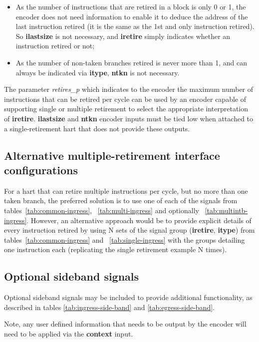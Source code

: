 \begin{itemize}
  \item As the number of instructions that are retired in a block is only 0 or 1, the 
    encoder does not need information to enable it to deduce the address of the last instruction 
    retired (it is the same as the 1st and only instruction retired).  So 
    \textbf{ilastsize} is not necessary, and \textbf{iretire} simply indicates whether an
    instruction retired or not;
  \item As the number of non-taken branches retired is never more than 1, and can always
    be indicated via \textbf{itype}, \textbf{ntkn} is not necessary.
\end{itemize}

The parameter \textit{retires\_p} which indicates to the encoder the maximum number of 
instructions that can be retired per cycle can be used by an encoder capable of supporting single or 
multiple retirement to select the appropriate interpretation of \textbf{iretire}.  
\textbf{ilastsize} and \textbf{ntkn} encoder inputs must be tied low when attached to a single-retirement
hart that does not provide these outputs.


\subsection{Alternative multiple-retirement interface configurations}

For a hart that can retire multiple instructions per cycle, but no more than one taken branch, the preferred 
solution is to use one of each of the signals from tables~\ref{tab:common-ingress}, ~\ref{tab:multi-ingress} and 
optionally ~\ref{tab:multintb-ingress}.  However, an alternative approach would be to provide explicit details of every 
instruction retired by using N sets of the signal group (\textbf{iretire}, \textbf{itype}) from 
tables~\ref{tab:common-ingress} and ~\ref{tab:single-ingress} with the groups detailing one instruction each 
(replicating the single retirement example N times).  

\subsection{Optional sideband signals}

Optional sideband signals may be included to provide additional functionality, as described in
tables \ref{tab:ingress-side-band} and \ref{tab:egress-side-band}.

Note, any user defined information that needs to be output by the encoder
will need to be applied via the \textbf{context} input.

